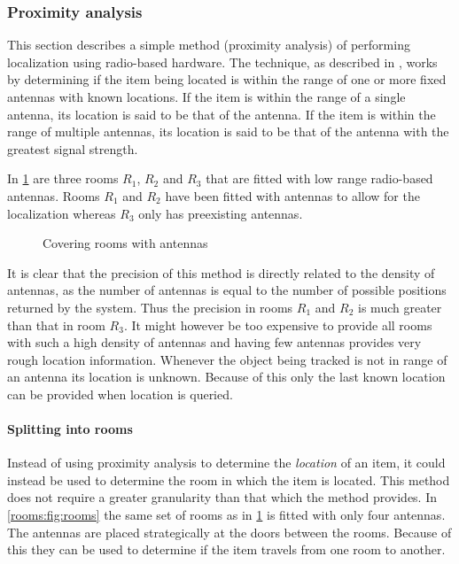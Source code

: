 \subsubsection{Proximity analysis}\label{rooms}
This section describes a simple method (proximity analysis) of performing localization using radio-based hardware.
The technique, as described in \citet[Section II.C Proximity]{wireless_survey}, works by determining if the item being located is within the range of one or more fixed antennas with known locations.
If the item is within the range of a single antenna, its location is said to be that of the antenna.
If the item is within the range of multiple antennas, its location is said to be that of the antenna with the greatest signal strength.

In \cref{rooms:fig:cover} are three rooms $R_1$, $R_2$ and $R_3$ that are fitted with low range radio-based antennas.
Rooms $R_1$ and $R_2$ have been fitted with antennas to allow for the localization whereas $R_3$ only has preexisting antennas.

\begin{figure}[h]
\centering

\caption{Covering rooms with antennas}
\label{rooms:fig:cover}
\end{figure}

It is clear that the precision of this method is directly related to the density of antennas, as the number of antennas is equal to the number of possible positions returned by the system.
Thus the precision in rooms $R_1$ and $R_2$ is much greater than that in room $R_3$.
It might however be too expensive to provide all rooms with such a high density of antennas and having few antennas provides very rough location information.
Whenever the object being tracked is not in range of an antenna its location is unknown.
Because of this only the last known location can be provided when location is queried.

\paragraph{Splitting into rooms}
Instead of using proximity analysis to determine the \textit{location} of an item, it could instead be used to determine the room in which the item is located.
This method does not require a greater granularity than that which the method provides.
In \cref{rooms:fig:rooms} the same set of rooms as in \cref{rooms:fig:cover} is fitted with only four antennas.
The antennas are placed strategically at the doors between the rooms.
Because of this they can be used to determine if the item travels from one room to another.

